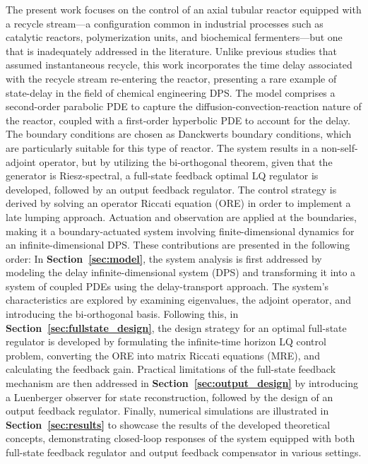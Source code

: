 The present work focuses on the control of an axial tubular reactor equipped with a recycle stream—a configuration common in industrial processes such as catalytic reactors, polymerization units, and biochemical fermenters—but one that is inadequately addressed in the literature. Unlike previous studies that assumed instantaneous recycle, this work incorporates the time delay associated with the recycle stream re-entering the reactor, presenting a rare example of state-delay in the field of chemical engineering DPS. The model comprises a second-order parabolic PDE to capture the diffusion-convection-reaction nature of the reactor, coupled with a first-order hyperbolic PDE to account for the delay. The boundary conditions are chosen as Danckwerts boundary conditions, which are particularly suitable for this type of reactor. The system results in a non-self-adjoint operator, but by utilizing the bi-orthogonal theorem, given that the generator is Riesz-spectral, a full-state feedback optimal LQ regulator is developed, followed by an output feedback regulator. The control strategy is derived by solving an operator Riccati equation (ORE) in order to implement a late lumping approach. Actuation and observation are applied at the boundaries, making it a boundary-actuated system involving finite-dimensional dynamics for an infinite-dimensional DPS. These contributions are presented in the following order: In \textbf{Section~\ref{sec:model}}, the system analysis is first addressed by modeling the delay infinite-dimensional system (DPS) and transforming it into a system of coupled PDEs using the delay-transport approach. The system's characteristics are explored by examining eigenvalues, the adjoint operator, and introducing the bi-orthogonal basis. Following this, in \textbf{Section~\ref{sec:fullstate_design}}, the design strategy for an optimal full-state regulator is developed by formulating the infinite-time horizon LQ control problem, converting the ORE into matrix Riccati equations (MRE), and calculating the feedback gain. Practical limitations of the full-state feedback mechanism are then addressed in \textbf{Section~\ref{sec:output_design}} by introducing a Luenberger observer for state reconstruction, followed by the design of an output feedback regulator. Finally, numerical simulations are illustrated in \textbf{Section~\ref{sec:results}} to showcase the results of the developed theoretical concepts, demonstrating closed-loop responses of the system equipped with both full-state feedback regulator and output feedback compensator in various settings.